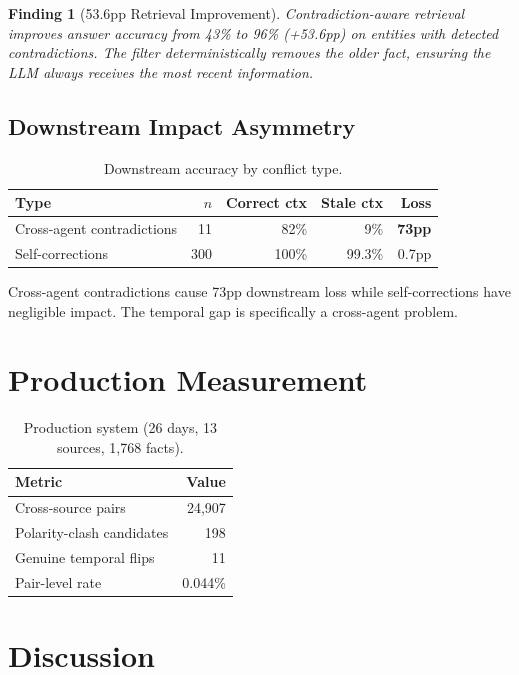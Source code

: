 \documentclass{article}
\newtheorem{finding}{Finding}
\begin{document}
\begin{finding}[53.6pp Retrieval Improvement]
Contradiction-aware retrieval improves answer accuracy from 43\% to 96\% (+53.6pp) on entities with detected contradictions. The filter deterministically removes the older fact, ensuring the LLM always receives the most recent information.
\end{finding}

\subsection{Downstream Impact Asymmetry}

\begin{table}[h]
\centering
\caption{Downstream accuracy by conflict type.}
\begin{tabular}{lrrrr}
\toprule
Type & $n$ & Correct ctx & Stale ctx & Loss \\
\midrule
Cross-agent contradictions & 11 & 82\% & 9\% & \textbf{73pp} \\
Self-corrections & 300 & 100\% & 99.3\% & 0.7pp \\
\bottomrule
\end{tabular}
\end{table}

Cross-agent contradictions cause 73pp downstream loss while self-corrections have negligible impact. The temporal gap is specifically a cross-agent problem.

\section{Production Measurement}

\begin{table}[h]
\centering
\caption{Production system (26 days, 13 sources, 1{,}768 facts).}
\begin{tabular}{lr}
\toprule
Metric & Value \\
\midrule
Cross-source pairs & 24{,}907 \\
Polarity-clash candidates & 198 \\
Genuine temporal flips & 11 \\
Pair-level rate & 0.044\% \\
\bottomrule
\end{tabular}
\end{table}

\section{Discussion}
\end{document}
